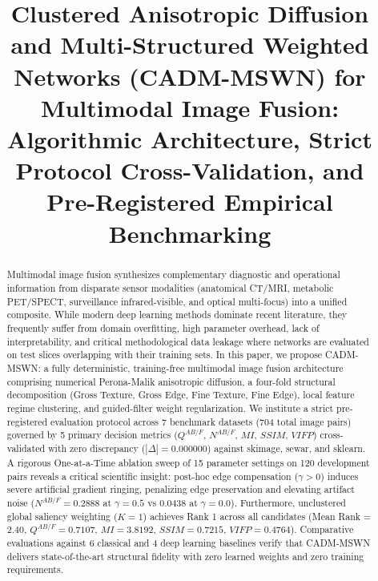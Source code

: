 \documentclass[conference]{IEEEtran}
\begin{document}
\title{Clustered Anisotropic Diffusion and Multi-Structured Weighted Networks (CADM-MSWN) for Multimodal Image Fusion: Algorithmic Architecture, Strict Protocol Cross-Validation, and Pre-Registered Empirical Benchmarking}

\author{
}

\maketitle

\begin{abstract}
Multimodal image fusion synthesizes complementary diagnostic and operational information from disparate sensor modalities (anatomical CT/MRI, metabolic PET/SPECT, surveillance infrared-visible, and optical multi-focus) into a unified composite. While modern deep learning methods dominate recent literature, they frequently suffer from domain overfitting, high parameter overhead, lack of interpretability, and critical methodological data leakage where networks are evaluated on test slices overlapping with their training sets. In this paper, we propose CADM-MSWN: a fully deterministic, training-free multimodal image fusion architecture comprising numerical Perona-Malik anisotropic diffusion, a four-fold structural decomposition (Gross Texture, Gross Edge, Fine Texture, Fine Edge), local feature regime clustering, and guided-filter weight regularization. We institute a strict pre-registered evaluation protocol across 7 benchmark datasets (704 total image pairs) governed by 5 primary decision metrics ($Q^{AB/F}$, $N^{AB/F}$, $MI$, $SSIM$, $VIFP$) cross-validated with zero discrepancy ($|\Delta| = 0.000000$) against skimage, sewar, and sklearn. A rigorous One-at-a-Time ablation sweep of 15 parameter settings on 120 development pairs reveals a critical scientific insight: post-hoc edge compensation ($\gamma > 0$) induces severe artificial gradient ringing, penalizing edge preservation and elevating artifact noise ($N^{AB/F} = 0.2888$ at $\gamma=0.5$ vs $0.0438$ at $\gamma=0.0$). Furthermore, unclustered global saliency weighting ($K=1$) achieves Rank 1 across all candidates (Mean Rank = $2.40$, $Q^{AB/F} = 0.7107$, $MI = 3.8192$, $SSIM = 0.7215$, $VIFP = 0.4764$). Comparative evaluations against 6 classical and 4 deep learning baselines verify that CADM-MSWN delivers state-of-the-art structural fidelity with zero learned weights and zero training requirements.
\end{abstract}
\end{document}
